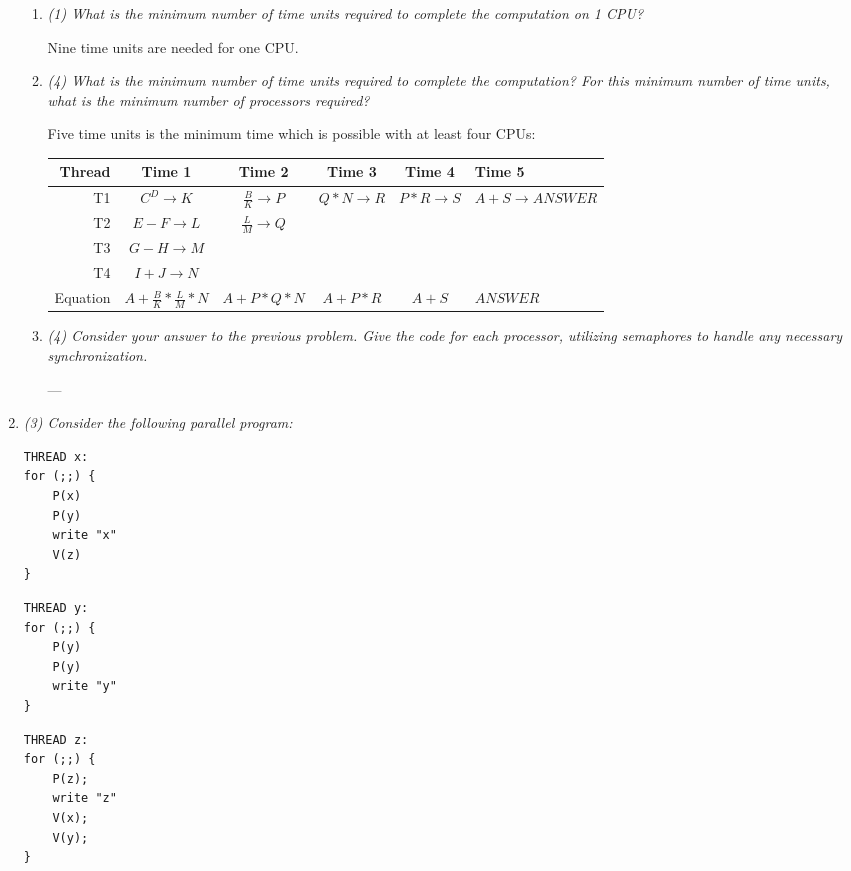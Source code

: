 \documentclass[letterpaper,11pt]{article}
\begin{document}
\begin{enumerate}
\begin{enumerate}
\item \emph{(1) What is the minimum number of time units required to complete the computation on 1 CPU?}

Nine time units are needed for one CPU.
\item \emph{(4) What is the minimum number of time units required to complete the computation? For this minimum number of time units, what is the minimum number of processors required?}

Five time units is the minimum time which is possible with at least four CPUs:

\begin{center}
  \begin{tabular}{r | c | c | c | c | l}
    Thread & Time 1 & Time 2 & Time 3 & Time 4 & Time 5 \\ \hline
    \hline
    T1 & $C^D \rightarrow K$ & $\frac{B}{K} \rightarrow P$ & $Q * N \rightarrow R$ & $P * R \rightarrow S$ & $A + S \rightarrow ANSWER$ \\ \hline
    T2    & $E-F \rightarrow L$  & $\frac{L}{M} \rightarrow Q$ &  &        &        \\ \hline
    T3    & $G-H \rightarrow M$  &        &        &        &        \\ \hline
    T4    & $I+J \rightarrow N$  &        &        &        &        \\ \hline
    \hline
    Equation & $A + \frac{B}{K} * \frac{L}{M} * N$ & $A + P * Q * N$ & $A + P * R$ & $A + S$ & $ANSWER$ \\ \hline
  \end{tabular}
\end{center}
\item \emph{(4) Consider your answer to the previous problem. Give the code for each processor, utilizing semaphores to handle any necessary synchronization.}

---
\end{enumerate}

\item \emph{(3) Consider the following parallel program:}

\begin{minipage}[t]{0.3\textwidth}
\begin{verbatim}
THREAD x:
for (;;) {
    P(x)
    P(y)
    write "x"
    V(z)
}
\end{verbatim}
\end{minipage}
\begin{minipage}[t]{0.3\textwidth}
\begin{verbatim}
THREAD y:
for (;;) {
    P(y)
    P(y)
    write "y"
}
\end{verbatim}
\end{minipage}
\begin{minipage}[t]{0.3\textwidth}
\begin{verbatim}
THREAD z:
for (;;) {
    P(z);
    write "z"
    V(x);
    V(y);
}
\end{verbatim} 
\end{minipage}



\end{enumerate}
\end{document}
